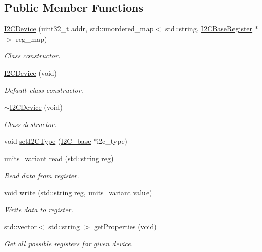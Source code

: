 \subsection*{Public Member Functions}
\begin{DoxyCompactItemize}
\item 
\hyperlink{class_i2_c_device_a2e69a2e93dd5c82309f9e4983b3a9e74}{I2\+C\+Device} (uint32\+\_\+t addr, std\+::unordered\+\_\+map$<$ std\+::string, \hyperlink{class_i2_c_base_register}{I2\+C\+Base\+Register} $\ast$ $>$ reg\+\_\+map)
\begin{DoxyCompactList}\small\item\em Class constructor. \end{DoxyCompactList}\item 
\hyperlink{class_i2_c_device_a2edfce0d3f4d430f118fd6cc01483791}{I2\+C\+Device} (void)
\begin{DoxyCompactList}\small\item\em Default class constructor. \end{DoxyCompactList}\item 
\hyperlink{class_i2_c_device_a6d3bfa5e15112985958df9366589cdc5}{$\sim$\+I2\+C\+Device} (void)
\begin{DoxyCompactList}\small\item\em Class destructor. \end{DoxyCompactList}\item 
void \hyperlink{class_i2_c_device_aa12a7448f16100f8ed5d9a9903e94014}{set\+I2\+C\+Type} (\hyperlink{class_i2_c__base}{I2\+C\+\_\+base} $\ast$i2c\+\_\+type)
\item 
\hyperlink{units__define_8hpp_a95d46867fa79633565c288a0b4bd5408}{units\+\_\+variant} \hyperlink{class_i2_c_device_a402c8a5ecfc405e9a30d509118c19e7b}{read} (std\+::string reg)
\begin{DoxyCompactList}\small\item\em Read data from register. \end{DoxyCompactList}\item 
void \hyperlink{class_i2_c_device_a916d9450534684ea0260cacf94a0b79b}{write} (std\+::string reg, \hyperlink{units__define_8hpp_a95d46867fa79633565c288a0b4bd5408}{units\+\_\+variant} value)
\begin{DoxyCompactList}\small\item\em Write data to register. \end{DoxyCompactList}\item 
std\+::vector$<$ std\+::string $>$ \hyperlink{class_i2_c_device_a33e7d15ba04e33f8d61c23659037cb57}{get\+Properties} (void)
\begin{DoxyCompactList}\small\item\em Get all possible registers for given device. \end{DoxyCompactList}\end{DoxyCompactItemize}


